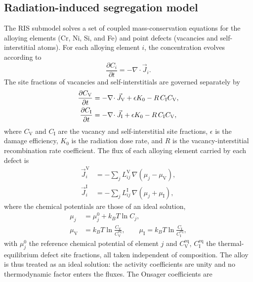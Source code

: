 \documentclass[3p,times]{elsarticle} %
\newcommand{\Vac}{\mathrm{V}}          %
\newcommand{\Int}{\mathrm{I}}          %
\begin{document}
\subsection{Radiation-induced segregation model}
\label{sec:methodRIS}

The RIS submodel solves a set of coupled mass-conservation equations for the
alloying elements (Cr, Ni, Si, and Fe) and point defects (vacancies and
self-interstitial atoms). For each alloying element \(i\), the concentration evolves
according to
\begin{equation}
\frac{\partial C_i}{\partial t}=-\nabla\!\cdot\vec{J}_i .
\label{eq:mass-metal}
\end{equation}
The site fractions of vacancies and self-interstitials are governed separately by
\begin{align}
\frac{\partial C_{\Vac}}{\partial t}
 &= -\nabla\!\cdot\vec{J}_{\rm V}+\epsilon K_0-R\,C_{\Int}C_{\Vac},
\label{eq:mass-vac}\\
\frac{\partial C_{\Int}}{\partial t}
 &= -\nabla\!\cdot\vec{J}_{\Int}+\epsilon K_0-R\,C_{\Int}C_{\Vac},
\label{eq:mass-int}
\end{align}
where \(C_{\Vac}\) and \(C_{\Int}\) are the vacancy and self-interstitial site
fractions, \(\epsilon\) is the damage efficiency, \(K_0\) is the radiation dose rate,
and \(R\) is the vacancy-interstitial recombination rate coefficient. The flux of each
alloying element carried by each defect is
\begin{align}
\vec{J}_i^{\Vac} &= -\sum_j L_{ij}^{\Vac}\,
   \nabla\!\left(\mu_j-\mu_{\Vac}\right),
\label{eq:flux-vac}\\
\vec{J}_i^{\Int} &= -\sum_j L_{ij}^{\Int}\,
   \nabla\!\left(\mu_j+\mu_{\Int}\right),
\label{eq:flux-int}
\end{align}
where the chemical potentials are those of an ideal solution,
\begin{align}
\mu_j &= \mu_j^{0}+k_BT\ln C_j,
\label{eq:mu-atom}\\
\mu_{\Vac} &= k_BT\ln\frac{C_{\Vac}}{C_{\Vac}^{\mathrm{eq}}},\qquad
\mu_{\Int} = k_BT\ln\frac{C_{\Int}}{C_{\Int}^{\mathrm{eq}}},
\label{eq:mu-defect}
\end{align}
with \(\mu_j^{0}\) the reference chemical potential of element \(j\) and
\(C_{\Vac}^{\mathrm{eq}}\), \(C_{\Int}^{\mathrm{eq}}\) the thermal-equilibrium
defect site fractions, all taken independent of composition. The alloy is thus
treated as an ideal solution: the activity coefficients are unity and no
thermodynamic factor enters the fluxes. The Onsager coefficients are
\end{document}
